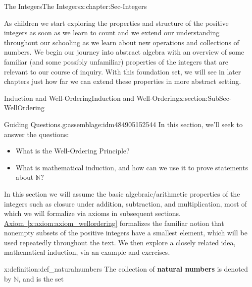 \documentclass[oneside,10pt,]{book}
\newcommand{\xreffont}{\relax}
\newcommand{\terminology}[1]{\textbf{#1}}
\numberwithin{equation}{section}
\def\N{{\mathbb N}}
\begin{document}
\begin{chapterptx}{The Integers}{}{The Integers}{}{}{x:chapter:Sec-Integers}
\begin{introduction}{}%
As children we start exploring the properties and structure of the positive integers as soon as we learn to count and we extend our understanding throughout our schooling as we learn about new operations and collections of numbers. We begin our journey into abstract algebra with an overview of some familiar (and some possibly unfamiliar) properties of the integers that are relevant to our course of inquiry. With this foundation set, we will see in later chapters just how far we can extend these properties in more abstract setting.%
\end{introduction}%
%
%
\typeout{************************************************}
\typeout{************************************************}
%
\begin{sectionptx}{Induction and Well-Ordering}{}{Induction and Well-Ordering}{}{}{x:section:SubSec-WellOrdering}
\begin{assemblage}{Guiding Questions.}{g:assemblage:idm484905152544}%
In this section, we'll seek to answer the questions: %
\begin{itemize}[label=\textbullet]
\item{}What is the Well-Ordering Principle?%
\item{}What is mathematical induction, and how can we use it to prove statements about \(\N\)?%
\end{itemize}
%
\end{assemblage}
\begin{introduction}{}%
In this section we will assume the basic algebraic\slash{}arithmetic properties of the integers such as closure under addition, subtraction, and multiplication, most of which we will formalize via axioms in subsequent sections. \hyperref[x:axiom:axiom_wellordering]{Axiom~{\xreffont\ref{x:axiom:axiom_wellordering}}} formalizes the familiar notion that nonempty subsets of the positive integers have a smallest element, which will be used repeatedly throughout the text. We then explore a closely related idea, mathematical induction, via an example and exercises.%
\end{introduction}%
\begin{definition}{}{x:definition:def_naturalnumbers}%
\index{\(\N\)} The collection of \terminology{natural numbers} is denoted by \(\N\), and is the set%
\begin{equation*}

\end{equation*}
\end{definition}
\end{sectionptx}
\end{chapterptx}
\end{document}
